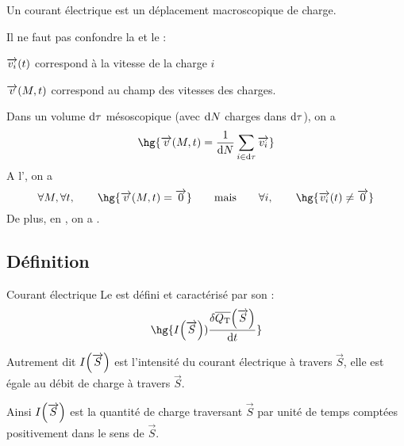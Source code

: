 \documentclass[a4paper,french,bookmarks]{book}
\begin{document}
    Un courant électrique est un déplacement macroscopique de charge.
    
    \begin{warning}{}{}
        Il ne faut pas confondre la  et le  :
        \begin{enumerate}
            \itt $\overrightarrow{v_i}\!\left(t\right)$ correspond à la vitesse de la charge $i$
            
            \itt $\overrightarrow{v}\!\left(M, t\right)$ correspond au champ des vitesses des charges.
        \end{enumerate}
        Dans un volume $\mathrm d \tau$ mésoscopique (avec $\mathrm d N$ charges dans $\mathrm d \tau$), on a 
        \[ \hg{\vec{v}\p{M, t} = \dfrac{1}{\dif N} \sum_{i \in \dif \tau} \vec{v_i}}\]
        A l', on a 
        \[ \forall M, \forall t, \qquad \hg{\vec{v}\p{M, t} = \vec{0}} \qquad\text{mais}\qquad \forall i,\qquad \hg{\vec{v_i}\p{t} \neq \vec{0}}\]
        De plus, en , on a .
    \end{warning}
    
    \subsection{Définition}
    
    \begin{definition}{Courant électrique}{}
        Le  est défini et caractérisé par son  :
        \[ \hg{I\p{\vec{S}} ) \dfrac{\delta \overline{Q_\text T}\p{\vec{S}}}{\dif t}} \]
    \end{definition}
    \begin{form}{Autrement dit}{}
        $I\!\left(\overrightarrow{S}\right)$ est l'intensité du courant électrique à travers $\vec{S}$, elle est égale au débit de charge à travers $\vec S$.
            
        Ainsi $I\!\left(\overrightarrow{S}\right)$ est la quantité de charge traversant $\vec S$ par unité de temps comptées positivement dans le sens de $\vec S$.
    \end{form}
    
    
    
    
    
    
    
    
\end{document}
